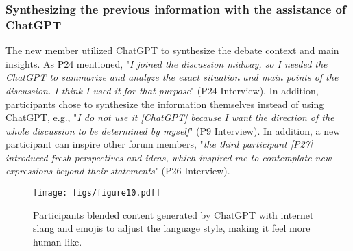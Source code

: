 \subsubsection{Synthesizing the previous information with the assistance of ChatGPT}
The new member utilized ChatGPT to synthesize the debate context and main insights. As P24 mentioned, "\textit{I joined the discussion midway, so I needed the ChatGPT to summarize and analyze the exact situation and main points of the discussion. I think I used it for that purpose}" (P24 Interview). In addition, participants chose to synthesize the information themselves instead of using ChatGPT, e.g., "\textit{I do not use it [ChatGPT] because I want the direction of the whole discussion to be determined by myself}" (P9 Interview). In addition, a new participant can inspire other forum members, "\textit{the third participant [P27] introduced fresh perspectives and ideas, which inspired me to contemplate new expressions beyond their statements}" (P26 Interview).


\begin{figure*}
    \centering
    \texttt{[image: figs/figure10.pdf]}
    \caption{Participants blended content generated by ChatGPT with internet slang and emojis to adjust the language style, making it feel more human-like.}
    \label{fig10}
\end{figure*}